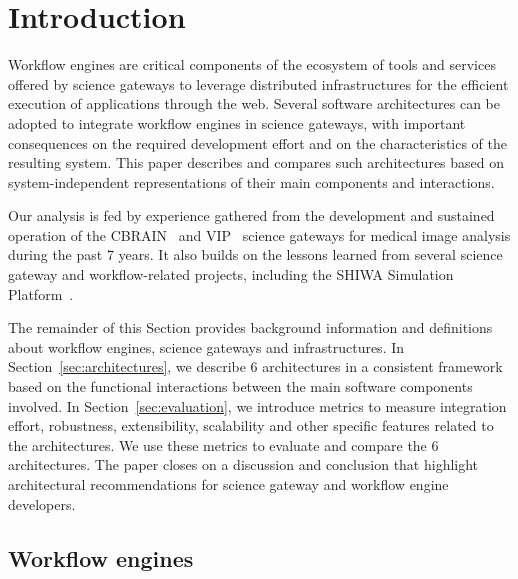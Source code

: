 \documentclass[preprint,3p,twocolumn]{elsarticle}
\begin{document}

\maketitle

\section{Introduction}

Workflow engines are critical components of the ecosystem of tools and
services offered by science gateways to leverage distributed
infrastructures for the efficient execution of applications through
the web. Several software architectures can be adopted to integrate
workflow engines in science gateways, with important consequences on
the required development effort and on the characteristics of the
resulting system. This paper describes and compares such architectures
based on system-independent representations of their main components
and interactions.

Our analysis is fed by experience gathered from the development and
sustained operation of the CBRAIN~\cite{SHER-14} and
VIP~\cite{GLAT-13} science gateways for medical image analysis during
the past 7 years. It also builds on the lessons learned from several
science gateway and workflow-related projects, including the SHIWA
Simulation Platform~\cite{terstyanszky2014enabling}.

The remainder of this Section provides background information and
definitions about workflow engines, science gateways and
infrastructures. In Section~\ref{sec:architectures}, we describe 6
architectures in a consistent framework based on the functional
interactions between the main software components involved. In
Section~\ref{sec:evaluation}, we introduce metrics to measure
integration effort, robustness, extensibility, scalability and other
specific features related to the architectures. We use these metrics
to evaluate and compare the 6 architectures. The paper closes on a
discussion and conclusion that highlight architectural recommendations
for science gateway and workflow engine developers.

\subsection{Workflow engines}
\end{document}
